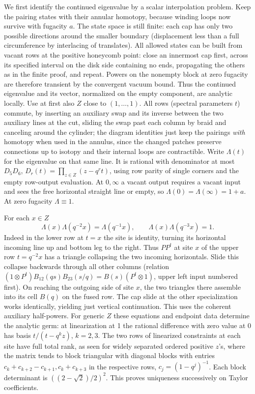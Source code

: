 \documentclass[11pt]{article}
\numberwithin{equation}{section}
\theoremstyle{definition}\newtheorem{definition}[theorem]{Definition}
\theoremstyle{remark}\newtheorem{remark}[theorem]{Remark}
\begin{document}
We first identify the continued eigenvalue by a scalar interpolation problem. Keep the pairing states with their annular homotopy, because winding loops now survive with fugacity $a$. The state space is still finite: each cap has only two possible directions around the smaller boundary (displacement less than a full circumference by interlacing of translates). All allowed states can be built from vacant rows at the positive honeycomb point: close an innermost cap first, across its specified interval on the disk side containing no ends, propagating the others as in the finite proof, and repeat. Powers on the nonempty block at zero fugacity are therefore transient by the convergent vacuum bound. Thus the continued eigenvalue and its vector, normalized on the empty component, are analytic locally. Use at first also \(Z\) close to \((1,\ldots,1)\). All rows (spectral parameters \(t\)) commute, by inserting an auxiliary swap and its inverse between the two auxiliary lines at the cut, sliding the swap past each column by braid and canceling around the cylinder; the diagram identities just keep the pairings \emph{with} homotopy when used in the annulus, since the changed patches preserve connections up to isotopy and their internal loops are contractible. Write \(\Lambda(t)\) for the eigenvalue on that same line. It is rational with denominator at most \(D_5 D_6\), \(D_r(t)=\prod_{z\in Z}(z-q^r t)\), using row parity of single corners and the empty row-output evaluation. At \(0,\infty\) a vacant output requires a vacant input and sees the free horizontal straight line or empty, so \(\Lambda(0)=\Lambda(\infty)=1+a\). At zero fugacity \(\Lambda\equiv1\).

For each \(x\in Z\)
\[
 \Lambda(x)\Lambda(q^{-2}x)=\Lambda(q^{-1}x),\qquad
 \Lambda(x)\Lambda(q^{-3}x)=1 .
\]
Indeed in the lower row at \(t=x\) the site is identity, turning its horizontal incoming line up and bottom leg to the right. Thus \(PP^t\) at site \(x\) of the upper row \(t=q^{-2}x\) has a triangle collapsing the two incoming horizontals. Slide this collapse backwards through all other columns (relation \((1\otimes P^t)B_{12}(qs)B_{23}(s/q)=B(s)(P^t\otimes1)\), upper left input numbered first). On reaching the outgoing side of site \(x\), the two triangles there assemble into its cell \(B(q)\) on the fused row. The cap slide at the other specialization works identically, yielding just vertical continuation. This uses the coherent auxiliary half-powers. For generic \(Z\) these equations and endpoint data determine the analytic germ: at linearization at 1 the rational difference with zero value at 0 has basis \(t/(t-q^k z)\), \(k=2,3\). The two rows of linearized constraints at each site have full total rank, as seen for widely separated ordered positive \(z\)'s, where the matrix tends to block triangular with diagonal blocks with entries \(c_k+c_{k+2}-c_{k+1},c_k+c_{k+3}\) in the respective rows, \(c_j=(1-q^j)^{-1}\). Each block determinant is \(((2-\sqrt2)/2)^2\). This proves uniqueness successively on Taylor coefficients.
\end{document}
